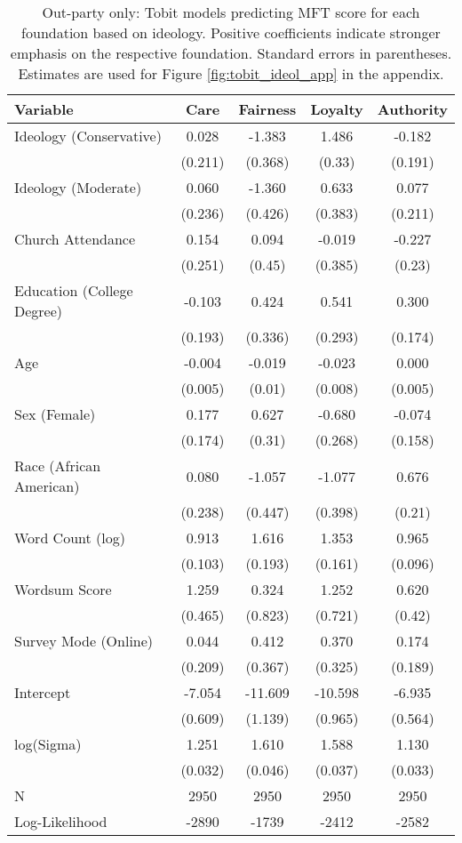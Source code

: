 \begin{table}[ht]
\centering
\caption{Out-party only: Tobit models predicting MFT score for each foundation based 
           on ideology. Positive coefficients indicate stronger emphasis on the respective 
           foundation. Standard errors in parentheses. Estimates are used for  
           Figure \ref{fig:tobit_ideol_app} in the appendix.} 
\label{tab:tobit_out}
\begingroup\footnotesize
\begin{tabular}{lcccc}
  \hline
Variable & Care & Fairness & Loyalty & Authority \\ 
  \hline
Ideology (Conservative) &  0.028 &  -1.383 &   1.486 & -0.182 \\ 
   & (0.211) & (0.368) & (0.33) & (0.191) \\ 
  Ideology (Moderate) &  0.060 &  -1.360 &   0.633 &  0.077 \\ 
   & (0.236) & (0.426) & (0.383) & (0.211) \\ 
  Church Attendance &  0.154 &   0.094 &  -0.019 & -0.227 \\ 
   & (0.251) & (0.45) & (0.385) & (0.23) \\ 
  Education (College Degree) & -0.103 &   0.424 &   0.541 &  0.300 \\ 
   & (0.193) & (0.336) & (0.293) & (0.174) \\ 
  Age & -0.004 &  -0.019 &  -0.023 &  0.000 \\ 
   & (0.005) & (0.01) & (0.008) & (0.005) \\ 
  Sex (Female) &  0.177 &   0.627 &  -0.680 & -0.074 \\ 
   & (0.174) & (0.31) & (0.268) & (0.158) \\ 
  Race (African American) &  0.080 &  -1.057 &  -1.077 &  0.676 \\ 
   & (0.238) & (0.447) & (0.398) & (0.21) \\ 
  Word Count (log) &  0.913 &   1.616 &   1.353 &  0.965 \\ 
   & (0.103) & (0.193) & (0.161) & (0.096) \\ 
  Wordsum Score &  1.259 &   0.324 &   1.252 &  0.620 \\ 
   & (0.465) & (0.823) & (0.721) & (0.42) \\ 
  Survey Mode (Online) &  0.044 &   0.412 &   0.370 &  0.174 \\ 
   & (0.209) & (0.367) & (0.325) & (0.189) \\ 
  Intercept & -7.054 & -11.609 & -10.598 & -6.935 \\ 
   & (0.609) & (1.139) & (0.965) & (0.564) \\ 
  log(Sigma) &  1.251 &   1.610 &   1.588 &  1.130 \\ 
   & (0.032) & (0.046) & (0.037) & (0.033) \\ 
   \hline
N & 2950 & 2950 & 2950 & 2950 \\ 
  Log-Likelihood & -2890 & -1739 & -2412 & -2582 \\ 
   \hline
\end{tabular}
\endgroup
\end{table}

